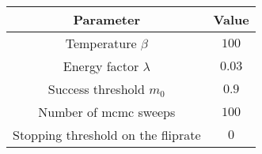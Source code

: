 \begin{tabular}{c c}
\toprule
Parameter                          & Value \\ \midrule
Temperature $\beta$                & $100$ \\
Energy factor $\lambda$            & $0.03$\\
Success threshold $m_0$            & $0.9$ \\
Number of \acrshort{mcmc} sweeps   & $100$ \\
Stopping threshold on the fliprate & $0$   \\
\bottomrule
\end{tabular}